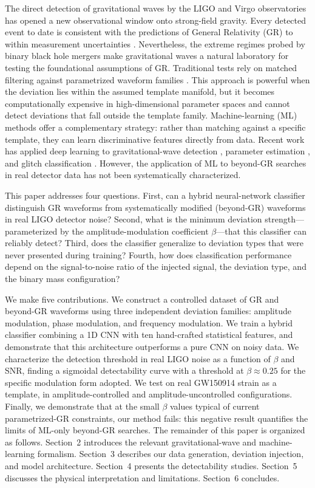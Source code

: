The direct detection of gravitational waves by the LIGO and Virgo
observatories \citep{Abbott2016} has opened a new observational window
onto strong-field gravity. Every detected event to date is consistent
with the predictions of General Relativity (GR) to within measurement
uncertainties \citep{Abbott2021tests}. Nevertheless, the extreme regimes
probed by binary black hole mergers make gravitational waves a natural
laboratory for testing the foundational assumptions of GR. Traditional
tests rely on matched filtering against parametrized waveform families
\citep{Yunes2019}. This approach is powerful when the deviation lies
within the assumed template manifold, but it becomes computationally
expensive in high-dimensional parameter spaces and cannot detect
deviations that fall outside the template family. Machine-learning (ML)
methods offer a complementary strategy: rather than matching against a
specific template, they can learn discriminative features directly from
data. Recent work has applied deep learning to gravitational-wave
detection \citep{George2018, Gebhard2019}, parameter estimation
\citep{Gabbard2020, Dax2021}, and glitch classification \citep{Zevin2017}.
However, the application of ML to beyond-GR searches in real detector
data has not been systematically characterized.

This paper addresses four questions. First, can a hybrid neural-network
classifier distinguish GR waveforms from systematically modified
(beyond-GR) waveforms in real LIGO detector noise? Second, what is the
minimum deviation strength---parameterized by the amplitude-modulation
coefficient $\beta$---that this classifier can reliably detect? Third,
does the classifier generalize to deviation types that were never
presented during training? Fourth, how does classification performance
depend on the signal-to-noise ratio of the injected signal, the deviation
type, and the binary mass configuration?

We make five contributions. We construct a controlled dataset of GR and
beyond-GR waveforms using three independent deviation families: amplitude
modulation, phase modulation, and frequency modulation. We train a hybrid
classifier combining a 1D CNN with ten hand-crafted statistical features,
and demonstrate that this architecture outperforms a pure CNN on noisy
data. We characterize the detection threshold in real LIGO noise as a
function of $\beta$ and SNR, finding a sigmoidal detectability curve with
a threshold at $\beta \approx 0.25$ for the specific modulation form
adopted. We test on real GW150914 strain as a template, in
amplitude-controlled and amplitude-uncontrolled configurations. Finally,
we demonstrate that at the small $\beta$ values typical of current
parametrized-GR constraints, our method fails: this negative result
quantifies the limits of ML-only beyond-GR searches. The remainder of
this paper is organized as follows. Section~2 introduces the relevant
gravitational-wave and machine-learning formalism. Section~3 describes
our data generation, deviation injection, and model architecture.
Section~4 presents the detectability studies. Section~5 discusses the
physical interpretation and limitations. Section~6 concludes.
